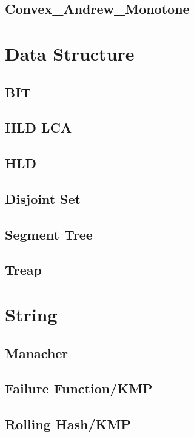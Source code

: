 	\subsection{Convex\_Andrew\_Monotone}
		
\section{Data Structure}
	\subsection{BIT}
		
	\subsection{HLD LCA}
		
	\subsection{HLD}
		
	\subsection{Disjoint Set}
		
	\subsection{Segment Tree}
		
	\subsection{Treap}
		
\section{String}
	\subsection{Manacher}
		
	\subsection{Failure Function/KMP}
		
	\subsection{Rolling Hash/KMP}
		
